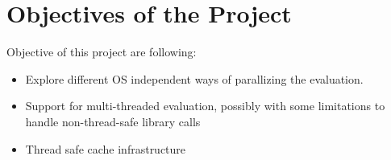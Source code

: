 \section{Objectives of the Project}
Objective of this project are following:
\begin{itemize}
\item Explore different OS independent ways of parallizing the evaluation.
\item Support for multi-threaded evaluation, possibly with some limitations to handle non-thread-safe library calls
\item Thread safe cache infrastructure
\end{itemize}
